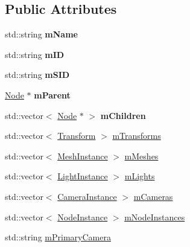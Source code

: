 \subsection*{Public Attributes}
\begin{DoxyCompactItemize}
\item 
\hypertarget{struct_assimp_1_1_collada_1_1_node_a6e3e5ffc264e0d3dbcc03b45586c08f9}{std\+::string {\bfseries m\+Name}}\label{struct_assimp_1_1_collada_1_1_node_a6e3e5ffc264e0d3dbcc03b45586c08f9}

\item 
\hypertarget{struct_assimp_1_1_collada_1_1_node_afb75ebeb0552c88d3c7709eeb4e279b8}{std\+::string {\bfseries m\+I\+D}}\label{struct_assimp_1_1_collada_1_1_node_afb75ebeb0552c88d3c7709eeb4e279b8}

\item 
\hypertarget{struct_assimp_1_1_collada_1_1_node_a1741acff6be3d88b364eb83b3a04aebc}{std\+::string {\bfseries m\+S\+I\+D}}\label{struct_assimp_1_1_collada_1_1_node_a1741acff6be3d88b364eb83b3a04aebc}

\item 
\hypertarget{struct_assimp_1_1_collada_1_1_node_ac98ce1f1c55830e849f0f02b54da7d7a}{\hyperlink{struct_assimp_1_1_collada_1_1_node}{Node} $\ast$ {\bfseries m\+Parent}}\label{struct_assimp_1_1_collada_1_1_node_ac98ce1f1c55830e849f0f02b54da7d7a}

\item 
\hypertarget{struct_assimp_1_1_collada_1_1_node_a07bca89e24621b03e5c75a9f9882b0d8}{std\+::vector$<$ \hyperlink{struct_assimp_1_1_collada_1_1_node}{Node} $\ast$ $>$ {\bfseries m\+Children}}\label{struct_assimp_1_1_collada_1_1_node_a07bca89e24621b03e5c75a9f9882b0d8}

\item 
std\+::vector$<$ \hyperlink{struct_assimp_1_1_collada_1_1_transform}{Transform} $>$ \hyperlink{struct_assimp_1_1_collada_1_1_node_a13b873fd4c2a1279ff24b40cc321f901}{m\+Transforms}
\item 
std\+::vector$<$ \hyperlink{struct_assimp_1_1_collada_1_1_mesh_instance}{Mesh\+Instance} $>$ \hyperlink{struct_assimp_1_1_collada_1_1_node_a8f47adb01cfbf847f0dcb5383ca51de9}{m\+Meshes}
\item 
std\+::vector$<$ \hyperlink{struct_assimp_1_1_collada_1_1_light_instance}{Light\+Instance} $>$ \hyperlink{struct_assimp_1_1_collada_1_1_node_ac03e565d7c286eb8125b68133255ce95}{m\+Lights}
\item 
std\+::vector$<$ \hyperlink{struct_assimp_1_1_collada_1_1_camera_instance}{Camera\+Instance} $>$ \hyperlink{struct_assimp_1_1_collada_1_1_node_a7adfb203ed36651da1dc4091bb629ca8}{m\+Cameras}
\item 
std\+::vector$<$ \hyperlink{struct_assimp_1_1_collada_1_1_node_instance}{Node\+Instance} $>$ \hyperlink{struct_assimp_1_1_collada_1_1_node_a0e19edb5bc25a3154ed0200fc19850b3}{m\+Node\+Instances}
\item 
std\+::string \hyperlink{struct_assimp_1_1_collada_1_1_node_aa07a8151db92d1186896f934af451ad6}{m\+Primary\+Camera}
\end{DoxyCompactItemize}


